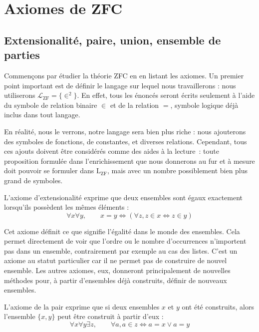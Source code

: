 \section{Axiomes de ZFC}

\subsection[Premiers axiomes]{Extensionalité, paire, union, ensemble de parties}

Commençons par étudier la théorie ZFC en en listant les axiomes. Un premier
point important est de définir le langage sur lequel nous travaillerons : nous
utiliserons $\mathcal L_{\mathrm{ZF}} = \{ \in^2\}$. En effet, tous les énoncés
seront écrits seulement à l'aide du symbole de relation binaire $\in$ et de la
relation $=$, symbole logique déjà inclus dans tout langage.

\begin{remark}
  En réalité, nous le verrons, notre langage sera bien plus riche : nous
  ajouterons des symboles de fonctions, de constantes, et diverses relations.
  Cependant, tous ces ajouts doivent être considérés comme des aides à la
  lecture~: toute proposition formulée dans l'enrichissement que nous donnerons
  au fur et à mesure doit pouvoir se formuler dans $\mathrm L_{\mathrm{ZF}}$, mais
  avec un nombre possiblement bien plus grand de symboles.
\end{remark}

\begin{axiom}[Extensionalité]\label{ax.ZF.ext}
  L'axiome d'extensionalité exprime que deux ensembles sont égaux exactement
  lorsqu'ils possèdent les mêmes éléments :
  \[\forall x \forall y, \qquad x = y \iff (\forall z, z \in x\iff z \in y)\]
\end{axiom}

Cet axiome définit ce que signifie l'égalité dans le monde des ensembles. Cela
permet directement de voir que l'ordre ou le nombre d'occurrences n'importent
pas dans un ensemble, contrairement par exemple au cas des listes. C'est un
axiome au statut particulier car il ne permet pas de construire de nouvel
ensemble. Les autres axiomes, eux, donneront principalement de nouvelles
méthodes pour, à partir d'ensembles déjà construits, définir de nouveaux
ensembles.

\begin{axiom}[Paire]\label{ax.ZF.pair}
  L'axiome de la pair exprime que si deux ensembles $x$ et $y$ ont été
  construits, alors l'ensemble $\{x,y\}$ peut être construit à partir d'eux :
  \[\forall x \forall y \exists z, \qquad \forall a, a \in z \iff
  a = x \lor a = y\]
\end{axiom}

